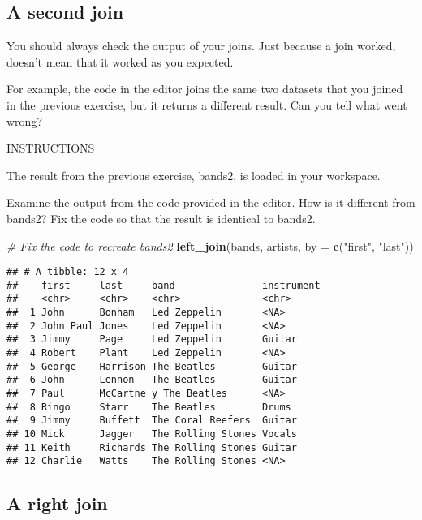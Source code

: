 \documentclass[]{article}
\newenvironment{Shaded}{\begin{snugshade}}{\end{snugshade}}
\newcommand{\KeywordTok}[1]{\textcolor[rgb]{0.13,0.29,0.53}{\textbf{#1}}}
\newcommand{\DataTypeTok}[1]{\textcolor[rgb]{0.13,0.29,0.53}{#1}}
\newcommand{\StringTok}[1]{\textcolor[rgb]{0.31,0.60,0.02}{#1}}
\newcommand{\CommentTok}[1]{\textcolor[rgb]{0.56,0.35,0.01}{\textit{#1}}}
\newcommand{\NormalTok}[1]{#1}
\begin{document}
\subsection{A second join}\label{a-second-join}

You should always check the output of your joins. Just because a join
worked, doesn't mean that it worked as you expected.

For example, the code in the editor joins the same two datasets that you
joined in the previous exercise, but it returns a different result. Can
you tell what went wrong?

INSTRUCTIONS

The result from the previous exercise, bands2, is loaded in your
workspace.

Examine the output from the code provided in the editor. How is it
different from bands2? Fix the code so that the result is identical to
bands2.

\begin{Shaded}
\begin{Highlighting}[]
\CommentTok{# Fix the code to recreate bands2}
\KeywordTok{left_join}\NormalTok{(bands, artists, }\DataTypeTok{by =} \KeywordTok{c}\NormalTok{(}\StringTok{"first"}\NormalTok{, }\StringTok{"last"}\NormalTok{))}
\end{Highlighting}
\end{Shaded}

\begin{verbatim}
## # A tibble: 12 x 4
##    first     last     band               instrument
##    <chr>     <chr>    <chr>              <chr>     
##  1 John      Bonham   Led Zeppelin       <NA>      
##  2 John Paul Jones    Led Zeppelin       <NA>      
##  3 Jimmy     Page     Led Zeppelin       Guitar    
##  4 Robert    Plant    Led Zeppelin       <NA>      
##  5 George    Harrison The Beatles        Guitar    
##  6 John      Lennon   The Beatles        Guitar    
##  7 Paul      McCartne y The Beatles      <NA>      
##  8 Ringo     Starr    The Beatles        Drums     
##  9 Jimmy     Buffett  The Coral Reefers  Guitar    
## 10 Mick      Jagger   The Rolling Stones Vocals    
## 11 Keith     Richards The Rolling Stones Guitar    
## 12 Charlie   Watts    The Rolling Stones <NA>
\end{verbatim}

\subsection{A right join}\label{a-right-join}
\end{document}
